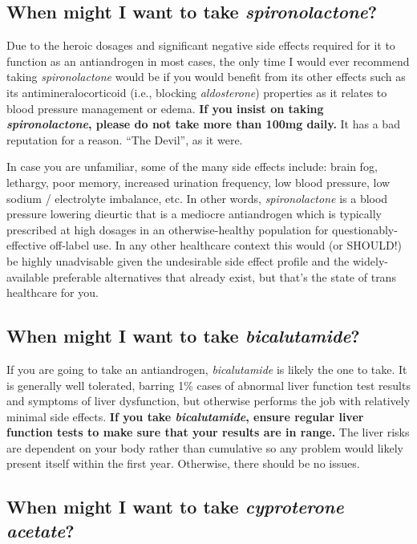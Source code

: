 \documentclass{article}
\begin{document}
\subsection{When might I want to take \textit{spironolactone}?}

Due to the heroic dosages and significant negative side effects required for it to function as an antiandrogen in most cases, the only time I would ever recommend taking \textit{spironolactone} would be if you would benefit from its other effects such as its antimineralocorticoid (i.e., blocking \textit{aldosterone}) properties as it relates to blood pressure management or edema. \textbf{If you insist on taking \textit{spironolactone}, please do not take more than 100mg daily.} It has a bad reputation for a reason. “The Devil”, as it were.

In case you are unfamiliar, some of the many side effects include: brain fog, lethargy, poor memory, increased urination frequency, low blood pressure, low sodium / electrolyte imbalance, etc. In other words, \textit{spironolactone} is a blood pressure lowering dieurtic that is a mediocre antiandrogen which is typically prescribed at high dosages in an otherwise-healthy population for questionably-effective off-label use. In any other healthcare context this would (or SHOULD!) be highly unadvisable given the undesirable side effect profile and the widely-available preferable alternatives that already exist, but that's the state of trans healthcare for you.

\subsection{When might I want to take \textit{bicalutamide}?}

If you are going to take an antiandrogen, \textit{bicalutamide} is likely the one to take. It is generally well tolerated, barring 1\% cases of abnormal liver function test results and symptoms of liver dysfunction, but otherwise performs the job with relatively minimal side effects. \textbf{If you take \textit{bicalutamide}, ensure regular liver function tests to make sure that your results are in range. }The liver risks are dependent on your body rather than cumulative so any problem would likely present itself within the first year. Otherwise, there should be no issues. 

\subsection{When might I want to take \textit{cyproterone acetate}?}
\end{document}
